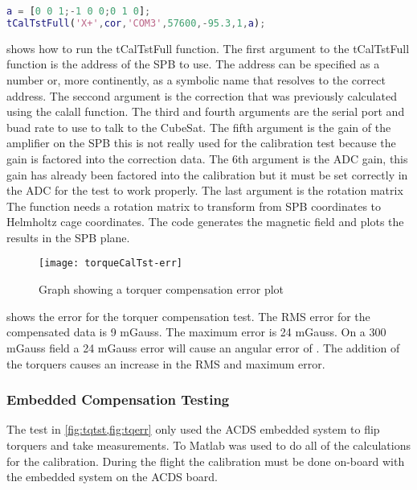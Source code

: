 \begin{lstlisting}[style=code,caption={Running torquer compensation test for the X+ \ac{SPB}},label={lst:tCalTst},language=Matlab]
a = [0 0 1;-1 0 0;0 1 0];
tCalTstFull('X+',cor,'COM3',57600,-95.3,1,a);
\end{lstlisting}

 shows how to run the tCalTstFull function. The first argument to the tCalTstFull function is the address of the \ac{SPB} to use. The address can be specified as a number or, more continently, as a symbolic name that resolves to the correct address. The seccond argument is the correction that was previously calculated using the calall function. The third and fourth arguments are the serial port and buad rate to use to talk to the CubeSat. The fifth argument is the gain of the amplifier on the \ac{SPB} this is not really used for the calibration test because the gain is factored into the correction data. The 6th argument is the \ac{ADC} gain, this gain has already been factored into the calibration but it must be set correctly in the \ac{ADC} for the test to work properly. The last argument is the rotation matrix  The function needs a rotation matrix to transform from \ac{SPB} coordinates to Helmholtz cage coordinates. The code generates the magnetic field and plots the results in the \ac{SPB} plane.

\begin{figure}[!ht]
    \centering
    \texttt{[image: torqueCalTst-err]}
    \caption{Graph showing a torquer compensation error plot}
    \label{fig:tqerr}
\end{figure}

 shows the error for the torquer compensation test. The RMS error for the compensated data is 9 mGauss. The maximum error is 24 mGauss. On a 300 mGauss field a 24 mGauss error will cause an angular error of \textdegree. The addition of the torquers causes an increase in the RMS and maximum error.


\subsubsection{Embedded Compensation Testing}

The test in \cref{fig:tqtst,fig:tqerr} only used the \ac{ACDS} embedded system to flip torquers and take measurements. To Matlab was used to do all of the calculations for the calibration. During the flight the calibration must be done on-board with the embedded system on the \ac{ACDS} board.

